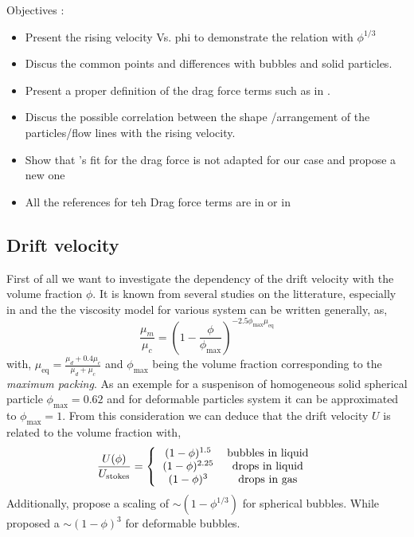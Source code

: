 Objectives : 
\begin{itemize}
    \item Present the rising velocity Vs. phi to demonstrate the relation with $\phi^{1/3}$ \citep{loisy2017buoyancy}
    \item Discus the common points and differences with bubbles and solid particles. 
    \item Present a proper definition of the drag force terms such as in \citet{wang2021numerical}. 
    \item Discus the possible correlation between the shape /arrangement of the particles/flow lines with the rising velocity. 
    \item Show that \citet{rusche2000effect}'s fit for the drag force is not adapted for our case and propose a new one
    \item All the references for teh Drag force terms are in \citet[chap 8]{morel2015mathematical} or in \citet{ishii2010thermo}
\end{itemize}

\subsection{Drift velocity}
First of all we want to investigate the dependency of the drift velocity with the volume fraction $\phi$. 
It is known from several studies on the litterature, especially in \citep[chapter 8]{morel2015mathematical} and \citet[chapter 12]{ishii2010thermo} the the viscosity model for various system can be written generally, as,
\begin{equation*}
    \frac{\mu_m}{\mu_c}
    = \left(
        1 - \frac{\phi}{\phi_\text{max}}
    \right)^{-2.5 \phi_\text{max}\mu_\text{eq}}
\end{equation*}  
with, $\mu_\text{eq} = \frac{\mu_d + 0.4 \mu_c}{\mu_d+\mu_c}$ and $\phi_\text{max}$ being the volume fraction corresponding to the \textit{maximum packing}. 
As an exemple for a suspenison of homogeneous solid spherical particle $\phi_\text{max} = 0.62$ and for deformable particles system it can be approximated to $\phi_\text{max} = 1$. 
From this consideration we can deduce that the drift velocity $U$ is related to the volume fraction with, 
\begin{equation*}
    \frac{U(\phi)}{U_\text{stokes}} = \left\{\begin{tabular}{cc}
        $(1-\phi)^{1.5}$   & bubbles in liquid \\
        $(1-\phi)^{2.25}$   & drops in liquid \\
        $(1-\phi)^{3}$   & drops in gas \\
    \end{tabular}\right.
\end{equation*} 
Additionally, \citet{bunner2003effect} propose a scaling of $\sim (1 - \phi^{1/3})$ for spherical bubbles.
While \citet{ishii1979drag} proposed a $\sim (1 - \phi)^3$ for deformable bubbles. 

